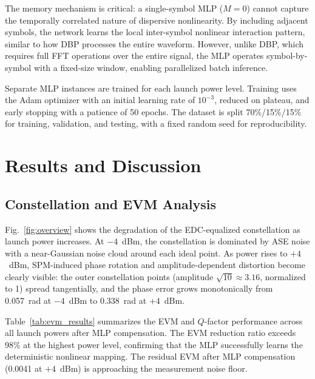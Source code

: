 \documentclass[conference]{IEEEtran}
\begin{document}
The memory mechanism is critical: a single-symbol MLP ($M = 0$) cannot capture the temporally correlated nature of dispersive nonlinearity. By including adjacent symbols, the network learns the local inter-symbol nonlinear interaction pattern, similar to how DBP processes the entire waveform. However, unlike DBP, which requires full FFT operations over the entire signal, the MLP operates symbol-by-symbol with a fixed-size window, enabling parallelized batch inference.

Separate MLP instances are trained for each launch power level. Training uses the Adam optimizer with an initial learning rate of $10^{-3}$, reduced on plateau, and early stopping with a patience of 50 epochs. The dataset is split 70\%/15\%/15\% for training, validation, and testing, with a fixed random seed for reproducibility.

\section{Results and Discussion}
\label{sec:results}

\subsection{Constellation and EVM Analysis}

Fig.~\ref{fig:overview} shows the degradation of the EDC-equalized constellation as launch power increases. At $-4$~dBm, the constellation is dominated by ASE noise with a near-Gaussian noise cloud around each ideal point. As power rises to $+4$~dBm, SPM-induced phase rotation and amplitude-dependent distortion become clearly visible: the outer constellation points (amplitude $\sqrt{10} \approx 3.16$, normalized to 1) spread tangentially, and the phase error grows monotonically from 0.057~rad at $-4$~dBm to 0.338~rad at $+4$~dBm.

Table~\ref{tab:evm_results} summarizes the EVM and $Q$-factor performance across all launch powers after MLP compensation. The EVM reduction ratio exceeds 98\% at the highest power level, confirming that the MLP successfully learns the deterministic nonlinear mapping. The residual EVM after MLP compensation (0.0041 at $+4$~dBm) is approaching the measurement noise floor.
\end{document}
